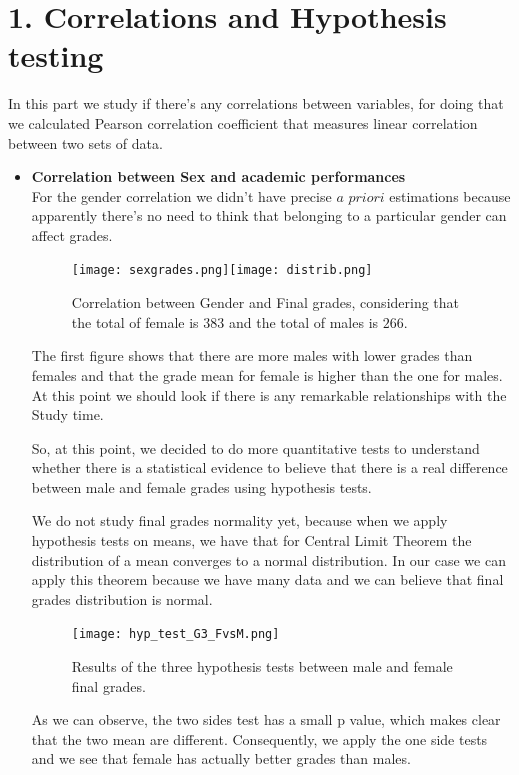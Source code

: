 \documentclass[a4paper, 11pt]{report}
\theoremstyle{definition}
\numberwithin{equation}{section}		%
\numberwithin{table}{section}				%
\begin{document}
\section*{1. Correlations and Hypothesis testing}
In this part we study if there's any correlations between variables, for doing that we calculated Pearson correlation coefficient that measures linear correlation between two sets of data.

\begin{itemize}
\item \textbf{Correlation between Sex and academic performances}
\\For the gender correlation we didn't have precise $a$ $priori$ estimations because apparently there's no need to think that belonging to a particular gender can affect grades.

\begin{figure}[h]\centering
\texttt{[image: sexgrades.png]}\quad\texttt{[image: distrib.png]}
\caption{Correlation between Gender and Final grades, considering that the total of female is $383$ and the total of males is $266$.}
\end{figure}

The first figure shows that there are more males with lower grades than females and that the grade mean for female is higher than the one for males. At this point we should look if there is any remarkable relationships with the Study time.

So, at this point, we decided to do more quantitative tests to understand
whether there is a statistical evidence to believe that there is a real 
difference between male and female grades using hypothesis tests.

We do not study final grades normality yet, because when we apply hypothesis
tests on means, we have that for Central Limit Theorem the distribution of
a mean converges to a normal distribution. In our case we can apply this theorem because we have many data and we can believe that final grades 
distribution is normal.

\begin{figure}[h]\centering
\texttt{[image: hyp\_test\_G3\_FvsM.png]}
\caption{Results of the three hypothesis tests between male and female final grades.}
\end{figure}

As we can observe, the two sides test has a small p value, which makes clear
that the two mean are different. Consequently, we apply the one side tests 
and we see that female has actually better grades than males.


\end{itemize}
\end{document}
